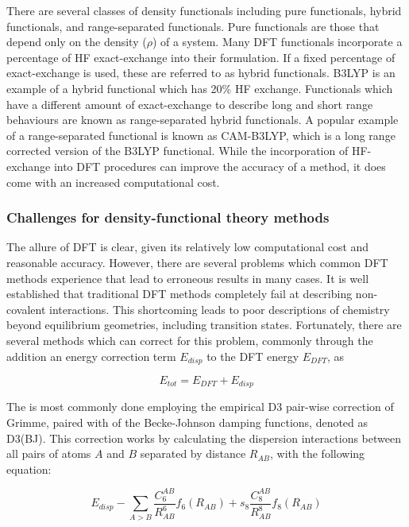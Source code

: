 There are several classes of density functionals including pure functionals,
hybrid functionals, and range-separated functionals. Pure functionals are those
that depend only on the density ($\rho$) of a system. Many DFT functionals
incorporate a percentage of HF exact-exchange into their formulation. If a fixed
percentage of exact-exchange is used, these are referred to as hybrid
functionals. B3LYP is an example of a hybrid functional which has 20\% HF
exchange. Functionals which have a different amount of exact-exchange to
describe long and short range behaviours are known as range-separated hybrid
functionals. A popular example of a range-separated functional is known as
CAM-B3LYP,\cite{Yanai2004} which is a long range corrected version of the B3LYP
functional. While the incorporation of HF-exchange into DFT procedures can
improve the accuracy of a method, it does come with an increased computational
cost.

\subsubsection{Challenges for density-functional theory methods}

The allure of DFT is clear, given its relatively low computational cost and
reasonable accuracy. However, there are several problems which common DFT
methods experience that lead to erroneous results in many cases.\cite{Cohen2012}
It is well established that traditional DFT methods completely fail at
describing non-covalent interactions.\cite{DiLabio2016} This shortcoming leads
to poor descriptions of chemistry beyond equilibrium geometries, including
transition states. Fortunately, there are several methods which can correct for
this problem, commonly through the addition an energy correction term $E_{disp}$
to the DFT energy $E_{DFT}$, as

\begin{equation}
  E_{tot} = E_{DFT} + E_{disp}
\end{equation}

\noindent The is most commonly done employing the empirical D3 pair-wise
correction of Grimme,\cite{Grimme2010} paired with of the Becke-Johnson damping
functions,\cite{Johnson2006} denoted as D3(BJ). This correction works by
calculating the dispersion interactions between all pairs of atoms $A$ and $B$
separated by distance $R_{AB}$, with the following equation:

\begin{equation}
  E_{disp} - \sum_{A>B} \frac{C_6^{AB}}{R_{AB}^6} f_6(R_{AB}) + s_8
  \frac{C_8^{AB}}{R_{AB}^8} f_8(R_{AB})
\end{equation}

